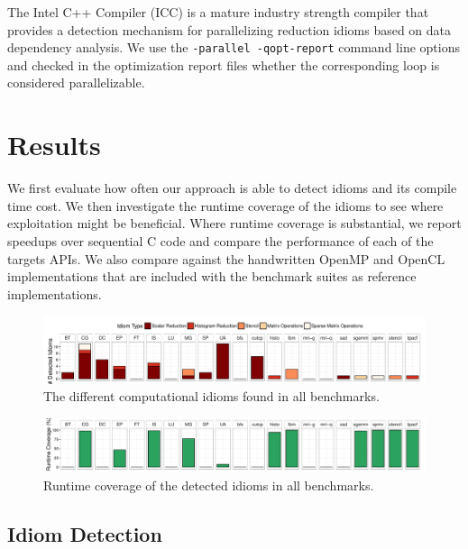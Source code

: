     The Intel C++ Compiler (ICC) is a mature industry strength compiler that
    provides a detection mechanism for parallelizing reduction idioms based on
    data dependency analysis.
    We use the \texttt{-parallel -qopt-report} command line options and checked
    in the optimization report files whether the corresponding loop is
    considered parallelizable.

\section{Results}
\label{sec:idiomresults}

    We first evaluate how often our approach is able to detect idioms and its
    compile time cost.
    We then investigate the runtime coverage of the idioms to see where
    exploitation might be beneficial.
    Where runtime coverage is substantial, we report speedups over sequential C
    code and compare the performance of each of the targets APIs.
    We also compare against the handwritten OpenMP and OpenCL implementations
    that are included with the benchmark suites as reference implementations.

\begin{figure}[t]
  \centering
  \includegraphics[width=\textwidth]{figures/asplosplots/detection.pdf}
  \caption{The different computational idioms found in all benchmarks.}
  \label{detection-figure}
\end{figure}
\begin{figure}[t]
  \centering
  \includegraphics[width=\textwidth]{figures/asplosplots/coverage.pdf}
  \caption{Runtime coverage of the detected idioms in all benchmarks.}
  \label{coverage-figure}
  \vspace{0.5em}
\end{figure}

\subsection{Idiom Detection}

